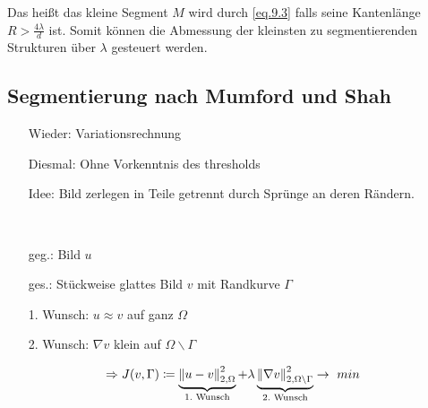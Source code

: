 Das heißt das kleine Segment $M$ wird durch \ref{eq.9.3}  falls seine Kantenlänge $R>\frac{4 \lambda}{d}$ ist. Somit können die Abmessung der kleinsten zu segmentierenden Strukturen über $\lambda$ gesteuert werden.

\subsection{Segmentierung nach Mumford und Shah}

\begin{minipage}{.65\textwidth}
    \begin{enumerate}
        \item[Wieder:] Variationsrechnung
        \item[Diesmal:] Ohne Vorkenntnis des thresholds
        \item[Idee:] Bild zerlegen in  Teile getrennt durch Sprünge an deren Rändern.
        \item[] \
        \item[geg.:] Bild $u$
        \item[ges.:] Stückweise glattes Bild $v$ mit Randkurve $\Gamma$
    \end{enumerate}
    \begin{enumerate}
        \item[1. Wunsch:] $u \approx v$ auf ganz $\Omega$
        \item[2. Wunsch:] $\nabla v$ klein auf $\Omega \backslash \Gamma$
    \end{enumerate}
\end{minipage}%
\begin{minipage}{0.3\textwidth}
\begin{center}
\end{center}
\end{minipage}

\[\Rightarrow J(v,\Gamma)  \coloneqq  \underbrace{\left\| u-v \right\|_{2,\Omega}^2}_{1. \text{ Wunsch}}  + \lambda \underbrace{\left\| \nabla v \right\|_{2,\Omega \backslash \Gamma}^2}_{2. \text{ Wunsch}} \to \ min \]

